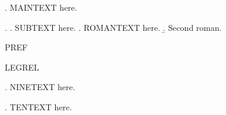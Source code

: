 

\ex. MAINTEXT here.

\ex.
\a. SUBTEXT here.
\a. ROMANTEXT here.
\b. Second roman.

PREF 

LEGREL \Last[a]

\setcounter{ExNo}{8}
\ex. NINETEXT here.

\ex. TENTEXT here.

